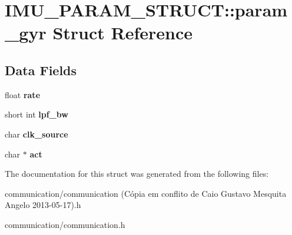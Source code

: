 \hypertarget{structIMU__PARAM__STRUCT_1_1param__gyr}{
\section{IMU\_\-PARAM\_\-STRUCT::param\_\-gyr Struct Reference}
\label{structIMU__PARAM__STRUCT_1_1param__gyr}
}
\subsection*{Data Fields}
\begin{DoxyCompactItemize}
\item 
\hypertarget{structIMU__PARAM__STRUCT_1_1param__gyr_a5aa70e1e9634411c89aacfbc570cc91c}{
float {\bfseries rate}}
\label{structIMU__PARAM__STRUCT_1_1param__gyr_a5aa70e1e9634411c89aacfbc570cc91c}

\item 
\hypertarget{structIMU__PARAM__STRUCT_1_1param__gyr_aa612f7299b43a1bf1fc597688c2fa02d}{
short int {\bfseries lpf\_\-bw}}
\label{structIMU__PARAM__STRUCT_1_1param__gyr_aa612f7299b43a1bf1fc597688c2fa02d}

\item 
\hypertarget{structIMU__PARAM__STRUCT_1_1param__gyr_aca3b791cb480f2da4703d4c256a7de48}{
char {\bfseries clk\_\-source}}
\label{structIMU__PARAM__STRUCT_1_1param__gyr_aca3b791cb480f2da4703d4c256a7de48}

\item 
\hypertarget{structIMU__PARAM__STRUCT_1_1param__gyr_a8b583edb905ed922572e46453e7d4adf}{
char $\ast$ {\bfseries act}}
\label{structIMU__PARAM__STRUCT_1_1param__gyr_a8b583edb905ed922572e46453e7d4adf}

\end{DoxyCompactItemize}


The documentation for this struct was generated from the following files:\begin{DoxyCompactItemize}
\item 
communication/communication (Cópia em conflito de Caio Gustavo Mesquita Angelo 2013-\/05-\/17).h\item 
communication/communication.h\end{DoxyCompactItemize}
